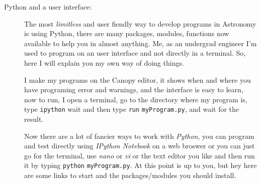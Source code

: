 \documentclass[11pt,fleqn]{book} %
\begin{document}
\begin{description}
																																																																																				        \item[Python and a user interface: ]The most \emph{limitless} and user fiendly way to develop programs in Astronomy is using Python, there are many packages, modules, functions now available to help you in almost anything. Me, as an undergrad engineer I'm used to program on an user interface and not directly in a terminal. So, here I will explain you my own way of doing things.
																																																																																					    
																																																																																					        I make my programs on the Canopy editor, it shows when and where you have programing error and warnings, and the interface is easy to learn, now to run, I open a terminal, go to the directory where my program is, type \verb|ipython| wait and then type \verb|run| \verb|myProgram.py|, and wait for the result.
																																																																																						    
																																																																																						        Now there are a lot of fancier ways to work with \emph{Python}, you can program and test directly using \emph{IPython Notebook} on a web broswer or you can just go for the terminal, use \emph{nano} or \emph{vi} or the text editor you like and then run it by typing \verb|python| \verb|myProgram.py|. At this point is up to you, but hey here are some links to start and the packages/modules you should install.
																																																																																							    

\end{description}
\end{document}
